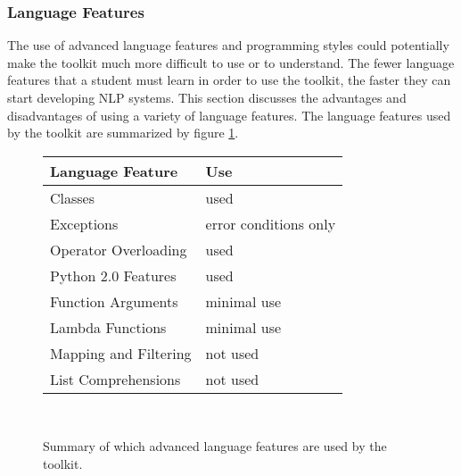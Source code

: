 \documentclass{article}
\begin{document}
\subsubsection{Language Features}

The use of advanced language features and programming styles could
potentially make the toolkit much more difficult to use or to
understand.  The fewer language features that a student must learn in
order to use the toolkit, the faster they can start developing NLP
systems.  This section discusses the advantages and disadvantages of
using a variety of language features.  The language features used by
the toolkit are summarized by figure \ref{fig:feature}.

\begin{figure}
\begin{centering}
\begin{tabular}{|l|l|}
\hline
\textbf{Language Feature} & \textbf{Use} \\
\hline
Classes & used \\
Exceptions & error conditions only \\
Operator Overloading & used \\
Python 2.0 Features & used \\
Function Arguments & minimal use \\
Lambda Functions & minimal use \\
Mapping and Filtering & not used \\
List Comprehensions & not used \\
\hline
\end{tabular}\\
\end{centering}
\caption{Summary of which advanced language features are used by the
toolkit.}
\label{fig:feature}
\end{figure}
\end{document}
